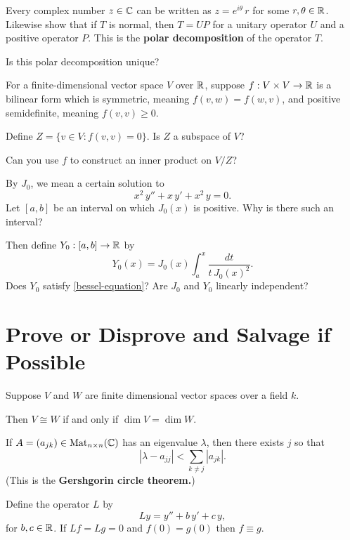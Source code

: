 \documentclass{homework}
\begin{document}
\begin{problem}
  Every complex number $z \in \mathbb{C}$ can be written as
  $z = e^{i \theta}\, r$ for some $r, \theta \in \mathbb{R}$.  Likewise show
  that if $T$ is normal, then $T = UP$ for a unitary operator $U$ and
  a positive operator $P$.  This is the \textbf{polar decomposition}
  of the operator $T$.

  Is this polar decomposition unique?
\end{problem}

\begin{problem}
  For a finite-dimensional vector space $V$ over $\mathbb{R}$, suppose
  $f : V \times V \to \mathbb{R}$ is a bilinear form which is symmetric,
  meaning $f(v,w) = f(w,v)$, and positive semidefinite, meaning
  $f(v,v) \geq 0$.

  Define $Z = \{ v \in V : f(v,v) = 0 \}$.  Is $Z$ a subspace of $V$?
  
  Can you use $f$ to construct an inner product on $V/Z$?
\end{problem}

\begin{problem}
  By $J_0$, we mean a certain solution to
  \begin{equation}\label{bessel-equation}\tag{$**$}
    x^2 \, y'' + x \, y' + x^2 \, y = 0.
  \end{equation}
  Let $[a,b]$ be an interval on which $J_0(x)$ is positive.  Why is
  there such an interval?

  Then define $Y_0 : [a,b] \to \mathbb{R}$ by 
  \[
    Y_0(x) = J_0(x) \int_a^x \frac{dt}{t \, J_0(x)^2}.
  \]
  Does $Y_0$ satisfy \eqref{bessel-equation}?  Are $J_0$ and $Y_0$
  linearly independent?
\end{problem}

\section{Prove or Disprove and Salvage if Possible}

\begin{problem}
  Suppose $V$ and $W$ are finite dimensional vector spaces over a field $k$.

  Then $V \cong W$ if and only if $\dim V = \dim W$.
\end{problem}

\begin{problem}
  If $A = (a_{jk}) \in \operatorname{Mat}_{n\times n}(\mathbb{C})$ has an eigenvalue $\lambda$, then
  there exists $j$ so that
  \[
    \left| \lambda - a_{jj} \right| < \sum_{k \neq j} \left|a_{jk} \right|.
  \]
  (This is the \textbf{Gershgorin circle theorem.})
\end{problem}

\begin{problem}
  Define the operator $L$ by
  \[
    Ly = y'' + b \, y' + c \, y,
  \]
  for $b, c \in \mathbb{R}$.  If $Lf = Lg = 0$ and $f(0) = g(0)$ then $f \equiv g$.
\end{problem}
\end{document}
